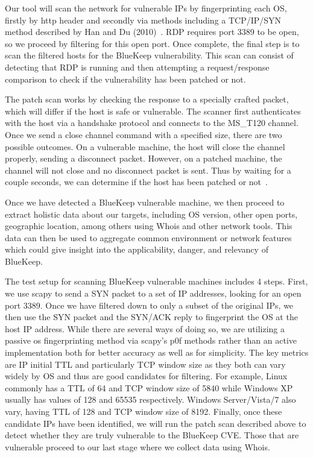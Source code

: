 Our tool will scan the network for vulnerable IPs by fingerprinting each OS, firstly by http header and secondly via methods including a TCP/IP/SYN method described by Han and Du (2010)~\cite{han_du_2010}. RDP requires port 3389 to be open, so we proceed by filtering for this open port. Once complete, the final step is to scan the filtered hosts for the BlueKeep vulnerability. This scan can consist of detecting that RDP is running and then attempting a request/response comparison to check if the vulnerability has been patched or not.

The patch scan works by checking the response to a specially crafted packet, which will differ if the host is safe or vulnerable. The scanner first authenticates with the host via a handshake protocol and connects to the MS\_T120 channel. Once we send a close channel command with a specified size, there are two possible outcomes. On a vulnerable machine, the host will close the channel properly, sending a disconnect packet. However, on a patched machine, the channel will not close and no disconnect packet is sent. Thus by waiting for a couple seconds, we can determine if the host has been patched or not~\cite{dillon_2019}.

Once we have detected a BlueKeep vulnerable machine, we then proceed to extract holistic data about our targets, including OS version, other open ports, geographic location, among others using Whois and other network tools. This data can then be used to aggregate common environment or network features which could give insight into the applicability, danger, and relevancy of BlueKeep.

The test setup for scanning BlueKeep vulnerable machines includes 4 steps. First, we use scapy to send a SYN packet to a set of IP addresses, looking for an open port 3389. Once we have filtered down to only a subset of the original IPs, we then use the SYN packet and the SYN/ACK reply to fingerprint the OS at the host IP address. While there are several ways of doing so, we are utilizing a passive os fingerprinting method via scapy's p0f methods rather than an active implementation both for better accuracy as well as for simplicity. The key metrics are IP initial TTL and particularly TCP window size as they both can vary widely by OS and thus are good candidates for filtering. For example, Linux commonly has a TTL of 64 and TCP window size of 5840 while Windows XP usually has values of 128 and 65535 respectively. Windows Server/Vista/7 also vary, having TTL of 128 and TCP window size of 8192. Finally, once these candidate IPs have been identified, we will run the patch scan described above to detect whether they are truly vulnerable to the BlueKeep CVE. Those that are vulnerable proceed to our last stage where we collect data using Whois.
